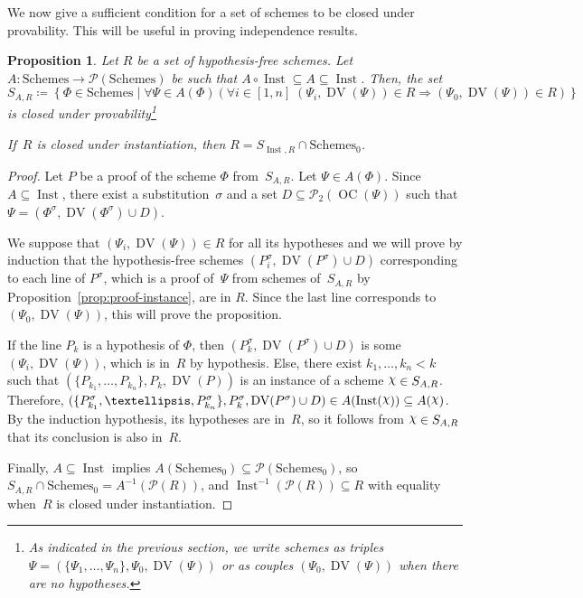 \documentclass[11pt]{article}
\DeclareRobustCommand{\Chi}{{\mathpalette\irchi\relax}}
\newcommand*{\irchi}[2]{\raisebox{\depth}{$#1\chi$}}%
\newcommand*{\calP}{\mathcal{P}}
\DeclareMathOperator{\DV}{DV}
\DeclareMathOperator{\OC}{OC}
\newcommand*{\Schemes}{\mathrm{Schemes}}
\newcommand*{\Schemeshypfree}{{\Schemes_0}}
\DeclareMathOperator{\Inst}{Inst}
\theoremstyle{plain}
\newtheorem{proposition}[theorem]{Proposition}
\theoremstyle{definition}
\theoremstyle{remark}
\begin{document}
We now give a sufficient condition for a set of schemes to be closed under provability.
This will be useful in proving independence results.

\begin{proposition}\label{prop:valid-sound}
Let $R$ be a set of hypothesis-free schemes.
Let $A \colon \Schemes \to \calP(\Schemes)$ be such that
$A \circ \Inst \subseteq A \subseteq \Inst$.
Then, the set
\begin{equation}\label{eq:validity}
S_{A, R} \coloneqq \left\{ \Phi \in \Schemes \mid
\forall \Psi \in A(\Phi)
\left(
\forall i \in [1, n] \; (\Psi_i, \DV(\Psi)) \in R
\Rightarrow
(\Psi_0, \DV(\Psi)) \in R
\right)
\right\}
\end{equation}
is closed under provability\footnote{
As indicated in the previous section, we write schemes as triples
$\Psi = (\{\Psi_1, \ldots, \Psi_n\}, \Psi_0, \DV(\Psi))$ or as couples
$(\Psi_0, \DV(\Psi))$ when there are no hypotheses.}

If~$R$ is closed under instantiation, then $R = S_{\Inst,R} \cap \Schemeshypfree$.
\end{proposition}


\begin{proof}
Let $P$ be a proof of the scheme $\Phi$ from~$S_{A, R}$.
Let $\Psi \in A(\Phi)$.
Since $A \subseteq \Inst$, there exist a substitution~$\sigma$ and a set
$D \subseteq \calP_2(\OC(\Psi))$ such that
$\Psi = (\Phi^\sigma, \DV(\Phi^\sigma) \cup D)$.

We suppose that $(\Psi_i, \DV(\Psi)) \in R$ for all its hypotheses and we will prove by induction
that the hypothesis-free schemes $(P_i^\sigma, \DV(P^\sigma) \cup D)$ corresponding to each line of
$P^\sigma$, which is a proof of~$\Psi$ from schemes of~$S_{A, R}$ by
Proposition~\ref{prop:proof-instance}, are in $R$.
Since the last line corresponds to $(\Psi_0, \DV(\Psi))$, this will prove the proposition.

If the line $P_k$ is a hypothesis of $\Phi$, then $(P_k^\sigma, \DV(P^\sigma) \cup D)$ is some
$(\Psi_i, \DV(\Psi))$, which is in~$R$ by hypothesis.
Else, there exist $k_1, \dots, k_n < k$ such that $(\{P_{k_1}, \dots, P_{k_n}\}, P_k, \DV(P))$
is an instance of a scheme $\Chi \in S_{A, R}$.
Therefore, $(\{ P_{k_1}^\sigma, \dots, P_{k_n}^\sigma \}, P_k^\sigma, \DV(P^\sigma) \cup D)
\in A(\Inst(\Chi)) \subseteq A(\Chi)$.
By the induction hypothesis, its hypotheses are in~$R$, so it follows from $\Chi \in S_{A, R}$ that
its conclusion is also in~$R$.

Finally, $A \subseteq \Inst$ implies $A(\Schemeshypfree) \subseteq \calP(\Schemeshypfree)$, so 
$S_{A, R} \cap \Schemeshypfree = A^{-1}(\calP(R))$, and $\Inst^{-1}(\calP(R)) \subseteq R$ with
equality when~$R$ is closed under instantiation.
\end{proof}
\end{document}
